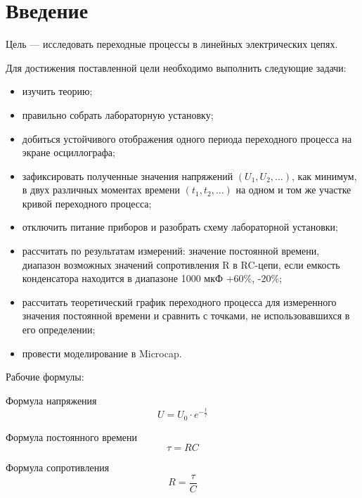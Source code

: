 \chapter*{Введение}
\label{ch:intro}
Цель — исследовать переходные процессы в линейных электрических цепях.

Для достижения поставленной цели необходимо выполнить следующие задачи:
\begin{itemize}
    \item изучить теорию;
    \item правильно собрать лабораторную установку;
    \item добиться устойчивого отображения одного периода переходного процесса на экране осциллографа;
    \item зафиксировать полученные значения напряжений $\left(U_1, U_2, \dots \right)$, как минимум, в двух различных моментах времени $\left(t_1, t_2, \dots \right)$ на одном и том же участке кривой переходного процесса;
    \item отключить питание приборов и разобрать схему лабораторной установки;
    \item рассчитать по результатам измерений: значение постоянной времени, диапазон возможных значений сопротивления R в RC-цепи, если емкость конденсатора находится в диапазоне 1000 мкФ +60\%, -20\%;
    \item рассчитать теоретический график переходного процесса для измеренного значения постоянной времени и сравнить с точками, не использовавшихся в его определении;
    \item провести моделирование в Microcap.
\end{itemize}

Рабочие формулы:

Формула напряжения
\begin{equation}
\label{eq:e1}
U=U_0 \cdot e^{-\frac{t}{\tau}}
\end{equation}

Формула постоянного времени
\begin{equation}
\label{eq:e2}
\tau=RC
\end{equation}

Формула сопротивления
\begin{equation}
\label{eq:e3}
R = \frac{\tau}{C}
\end{equation}


\endinput